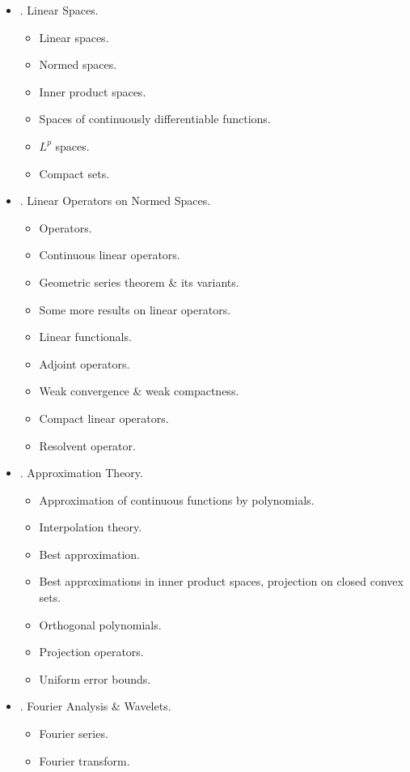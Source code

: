 \documentclass{article}
\begin{document}
\begin{itemize}
	\item {. Linear Spaces.}
	\begin{itemize}
		\item {\sf Linear spaces.}
		\item {\sf Normed spaces.}
		\item {\sf Inner product spaces.}
		\item {\sf Spaces of continuously differentiable functions.}
		\item {\sf$L^p$ spaces.}
		\item {\sf Compact sets.}
	\end{itemize}
	\item {. Linear Operators on Normed Spaces.}
	\begin{itemize}
		\item {\sf Operators.}
		\item {\sf Continuous linear operators.}
		\item {\sf Geometric series theorem \& its variants.}
		\item {\sf Some more results on linear operators.}
		\item {\sf Linear functionals.}
		\item {\sf Adjoint operators.}
		\item {\sf Weak convergence \& weak compactness.}
		\item {\sf Compact linear operators.}
		\item {\sf Resolvent operator.}
	\end{itemize}
	\item {. Approximation Theory.}
	\begin{itemize}
		\item {\sf Approximation of continuous functions by polynomials.}
		\item {\sf Interpolation theory.}
		\item {\sf Best approximation.}
		\item {\sf Best approximations in inner product spaces, projection on closed convex sets.}
		\item {\sf Orthogonal polynomials.}
		\item {\sf Projection operators.}
		\item {\sf Uniform error bounds.}
	\end{itemize}
	\item {. Fourier Analysis \& Wavelets.}
	\begin{itemize}
		\item {\sf Fourier series.}
		\item {\sf Fourier transform.}

\end{itemize}
\end{itemize}
\end{document}
